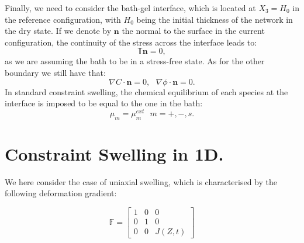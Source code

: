 \documentclass[12pt]{extarticle}
\newcommand{\F}{\ensuremath{\mathbb{F}}}
\begin{document}
Finally, we need to consider the bath-gel interface, which is located at $X_3=H_0$ in the reference configuration, with $H_0$ being the initial thickness of the network in the dry state. If we denote by $\mathbf{n}$ the normal to the surface in the current configuration, the continuity of the stress across the interface leads to: 
\begin{equation}
\mathbb{T} \mathbf{n}=0,
\end{equation}
as we are assuming the bath to be in a stress-free state. As for the other boundary we still have that:
\begin{equation}
\nabla C \cdot \mathbf{n} = 0, \ \ \ \nabla \phi \cdot \mathbf{n}=0.
\end{equation}
In standard constraint swelling, the chemical equilibrium of each species at the interface is imposed to be equal to the one in the bath:
\begin{equation}
\mu_m =\mu_m^{ext} \ \ \ m=+,-,s.
\end{equation}

\section{Constraint Swelling in 1D.}
We here consider the case of uniaxial swelling, which is characterised by the following deformation gradient:

\begin{equation}
\F= \begin{bmatrix}
1 &0&0\\
0&1&0\\
0&0& J(Z,t)
\end{bmatrix}                                                                      
\end{equation}
\end{document}

